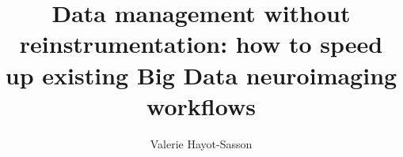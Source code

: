 \author{Valerie Hayot-Sasson}
\title{Data management without reinstrumentation: how to speed up existing Big Data neuroimaging workflows}
\PhD

